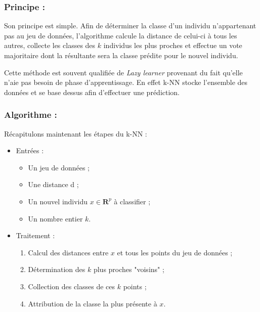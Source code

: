 \documentclass[11pt]{article}
\begin{document}
\begin{center}
\subsubsection{Principe :}

Son principe est simple. Afin de déterminer la classe d'un individu n'appartenant pas au jeu de données, l'algorithme calcule la distance de celui-ci à tous les autres, collecte les classes des $k$ individus les plus proches et effectue un vote majoritaire dont la résultante sera la classe prédite pour le nouvel individu.\par

Cette méthode est souvent qualifiée de \textit{Lazy learner} provenant du fait qu'elle n'aie pas besoin de phase d'apprentissage.
En effet k-NN stocke l'ensemble des données et se base dessus afin d'effectuer une prédiction.\par

\subsubsection{Algorithme :}

Récapitulons maintenant les étapes du k-NN :

    \begin{itemize}
        \item Entrées :
            \begin{itemize}
                \item Un jeu de données ;
                \item Une distance d ;
                \item Un nouvel individu $x \in \mathbf{R}^{p}$ à classifier ;
                \item Un nombre entier $k$.
            \end{itemize}
            
        \item Traitement :
            \begin{enumerate}
                \item Calcul des distances entre $x$ et tous les points du jeu de données ;
                \item Détermination des $k$ plus proches "voisins" ;
                \item Collection des classes de ces $k$ points ;
                \item Attribution de la classe la plus présente à $x$.
            \end{enumerate}
        

\end{itemize}
\end{center}
\end{document}
